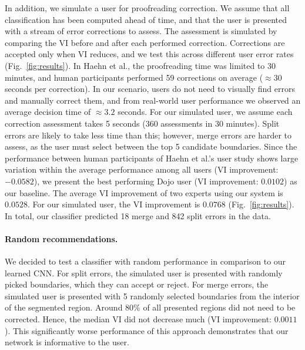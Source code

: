 In addition, we simulate a user for proofreading correction. We assume that all classification has been computed ahead of time, and that the user is presented with a stream of error corrections to assess. The assessment is simulated by comparing the VI before and after each performed correction. Corrections are accepted only when VI reduces, and we test this across different user error rates (Fig.~\ref{fig:results}). In Haehn et al., the proofreading time was limited to 30 minutes, and human participants performed 59 corrections on average ($\approx30$ seconds per correction). In our scenario, users do not need to visually find errors and manually correct them, and from real-world user performance we observed an average decision time of $\approx3.2$ seconds. For our simulated user, we assume each correction assessment takes 5 seconds (360 assessments in 30 minutes). Split errors are likely to take less time than this; however, merge errors are harder to assess, as the user must select between the top 5 candidate boundaries. Since the performance between human participants of Haehn et al.'s user study shows large variation within the average performance among all users (VI improvement: $-0.0582$), we present the best performing Dojo user (VI improvement: $0.0102$) as our baseline. The average VI improvement of two experts using our system is $0.0528$. For our simulated user, the VI improvement is $0.0768$ (Fig.~\ref{fig:results}). In total, our classifier predicted 18 merge and 842 split errors in the data.









\paragraph{Random recommendations.} We decided to test a classifier with random performance in comparison to our learned CNN. For split errors, the simulated user is presented with randomly picked boundaries, which they can accept or reject. For merge errors, the simulated user is presented with 5 randomly selected boundaries from the interior of the segmented region. Around 80\% of all presented regions did not need to be corrected. Hence, the median VI did not decrease much (VI improvement: $0.0011$). This significantly worse performance of this approach demonstrates that our network is informative to the user.

